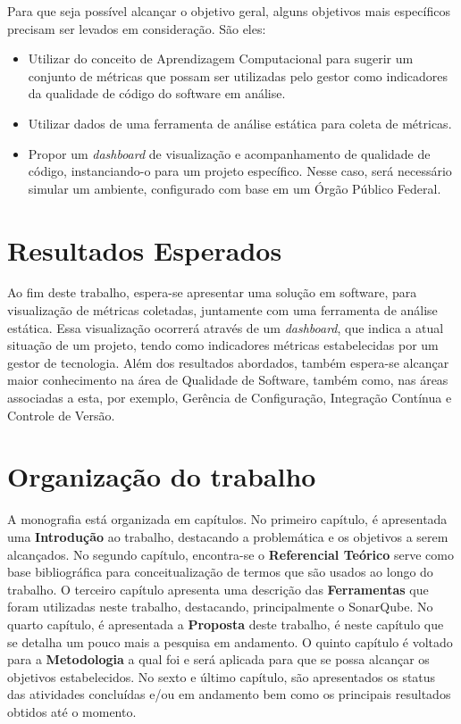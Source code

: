 	Para que seja possível alcançar o objetivo geral, alguns objetivos mais específicos precisam ser levados em consideração. São eles:
		
	\begin{itemize}
		\item Utilizar do conceito de Aprendizagem Computacional para sugerir um conjunto de métricas que possam ser utilizadas pelo gestor como indicadores da qualidade de código do software em análise.
		\item Utilizar dados de uma ferramenta de análise estática para coleta de métricas. 
		\item Propor um \textit{dashboard} de visualização e acompanhamento de qualidade de código, instanciando-o para um projeto específico. Nesse caso, será necessário simular um ambiente, configurado com base em um Órgão Público Federal.
		
	\end{itemize}
	
	
	\section{Resultados Esperados}

Ao fim deste trabalho, espera-se apresentar uma solução em software, para visualização de métricas coletadas,  juntamente com uma ferramenta de análise estática. Essa visualização ocorrerá através de um \textit{dashboard}, que indica a atual situação de um projeto, tendo como indicadores métricas estabelecidas por um gestor de tecnologia.
Além dos resultados abordados, também espera-se alcançar maior conhecimento na área de Qualidade de Software, também como, nas áreas associadas a esta, por exemplo, Gerência de Configuração, Integração Contínua e Controle de Versão.

	\section{Organização do trabalho} %
	\label{sec:organização_do_trabalho} 	
A monografia está organizada em capítulos. No primeiro capítulo, é apresentada uma \textbf{Introdução} ao trabalho, destacando a problemática e os objetivos a serem alcançados. No segundo capítulo, encontra-se o \textbf{Referencial Teórico} serve como base bibliográfica para conceitualização de termos que são usados ao longo do trabalho. O terceiro capítulo apresenta uma descrição das \textbf{Ferramentas} que foram utilizadas neste trabalho, destacando, principalmente o SonarQube. No quarto capítulo, é apresentada a \textbf{Proposta} deste trabalho, é neste capítulo que se detalha um pouco mais a pesquisa em andamento. O quinto capítulo é voltado para a \textbf{Metodologia} a qual foi e será aplicada para que se possa alcançar os objetivos estabelecidos. No sexto e último capítulo, são apresentados os status das atividades concluídas e/ou em andamento bem como os principais resultados obtidos até o momento.